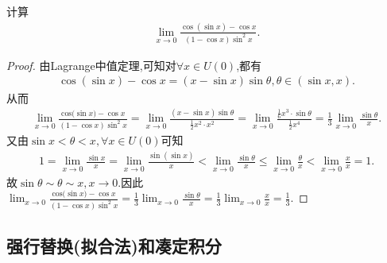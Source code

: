 \documentclass[lang=cn,newtx,10pt,scheme=chinese]{elegantbook}
\begin{document}
\begin{example}
   计算
\begin{align*}
   \lim_{x \to 0} \frac{\cos(\sin x) - \cos x}{(1 - \cos x)\sin^{2}x}.
\end{align*}
\end{example}
\begin{proof}
   由Lagrange中值定理,可知对$\forall x\in U\left( 0 \right)$,都有
   \begin{align*}
      \cos \left( \sin x \right) -\cos x=\left( x-\sin x \right) \sin \theta ,\theta \in \left( \sin x,x \right) .
   \end{align*}
   从而
   \begin{align*}
      \lim_{x\rightarrow 0} \frac{\mathrm{cos(}\sin x)-\cos x}{(1-\cos x)\sin ^2x}=\lim_{x\rightarrow 0} \frac{\left( x-\sin x \right) \sin \theta}{\frac{1}{2}x^2\cdot x^2}=\lim_{x\rightarrow 0} \frac{\frac{1}{6}x^3\cdot \sin \theta}{\frac{1}{2}x^4}=\frac{1}{3}\lim_{x\rightarrow 0} \frac{\sin \theta}{x}.
   \end{align*}
   又由$\sin x<\theta <x,\forall x\in U\left( 0 \right)$可知
   \begin{align*}
      1=\lim_{x\rightarrow 0} \frac{\sin x}{x}=\lim_{x\rightarrow 0} \frac{\sin \left( \sin x \right)}{x}<\lim_{x\rightarrow 0} \frac{\sin \theta}{x}\leqslant \lim_{x\rightarrow 0} \frac{\theta}{x}<\lim_{x\rightarrow 0} \frac{x}{x}=1.
   \end{align*}
   故$\sin \theta \sim \theta \sim x,x\rightarrow 0$.因此$\lim_{x\rightarrow 0} \frac{\mathrm{cos(}\sin x)-\cos x}{(1-\cos x)\sin ^2x}=\frac{1}{3}\lim_{x\rightarrow 0} \frac{\sin \theta}{x}=\frac{1}{3}\lim_{x\rightarrow 0} \frac{x}{x}=\frac{1}{3}$.
\end{proof}

\subsection{强行替换(拟合法)和凑定积分}\label{强行替换(拟合法)和凑定积分}
\end{document}

